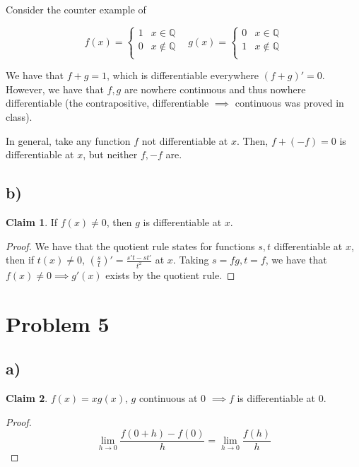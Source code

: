 \documentclass[12pt,letterpaper]{article}
\theoremstyle{definition}
\newtheorem*{claim}{Claim}
\newcommand{\Q}{\mathbb{Q}}
\begin{document}
\begin{proofof}
Consider the counter example of

\[
  f(x) = \begin{cases}
    1 & x \in \Q \\
    0 & x \notin \Q \\
  \end{cases}
  \ \ \ \ 
  g(x) = \begin{cases}
    0 & x \in \Q \\
    1 & x \notin \Q \\
  \end{cases}
\]

We have that $f + g = 1$, which is differentiable everywhere $(f + g)' = 0$.
However, we have that $f,g$ are nowhere continuous and thus nowhere
differentiable (the contrapositive, differentiable $\implies$ continuous was
proved in class).

In general, take any function $f$ not differentiable at $x$. Then, $f + (-f) =
0$ is differentiable at $x$, but neither $f, -f$ are.

\subsection*{b)}

\begin{claim}
  If $f(x) \neq 0$, then $g$ is differentiable at $x$.
\end{claim}

\begin{proof}
  We have that the quotient rule states for functions $s,t$ differentiable at
  $x$, then if $t(x) \neq 0$, $(\frac{s}{t})' = \frac{s't - st'}{t^2}$ at $x$.
  Taking $s = fg, t = f$, we have that $f(x) \neq 0 \implies g'(x)$ exists by
  the quotient rule.
\end{proof}

\section*{Problem 5}

\subsection*{a)}

\begin{claim}
  $f(x) = xg(x)$, $g$ continuous at 0 $\implies f$ is differentiable at $0$.
\end{claim}

\begin{proof}
  \[
    \lim_{h\rightarrow 0}\frac{f(0 + h) - f(0)}{h} = \lim_{h\rightarrow 0}\frac{f(h)}{h} 
  \]


\end{proof}
\end{proofof}
\end{document}
